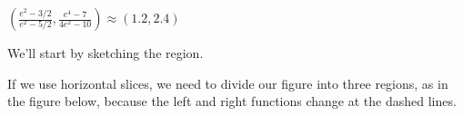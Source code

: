 \begin{answer}
$\displaystyle\left(\frac{e^2-3/2}{e^2-5/2},\frac{e^4-7}{4e^2-10}\right)\approx (1.2,2.4)$
\end{answer}
\begin{solution}
We'll start by sketching the region.
\begin{center}\end{center}

If we use horizontal slices, we need to divide our figure into three regions, as in the figure below, because the left and right functions change at the dashed lines.


\end{solution}
